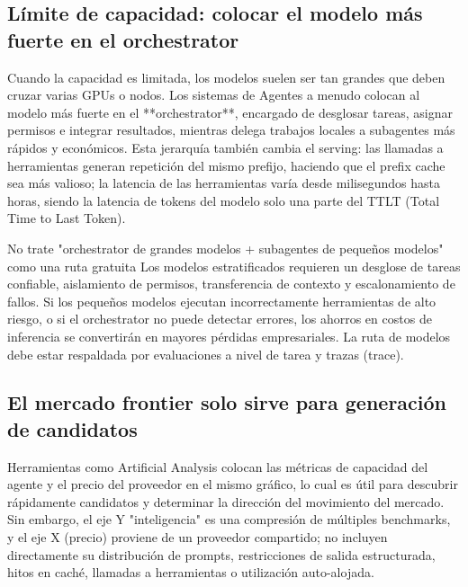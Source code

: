 
\subsection{Límite de capacidad: colocar el modelo más fuerte en el orchestrator}

Cuando la capacidad es limitada, los modelos suelen ser tan grandes que deben cruzar varias GPUs o nodos. Los sistemas de Agentes a menudo colocan al modelo más fuerte en el **orchestrator**, encargado de desglosar tareas, asignar permisos e integrar resultados, mientras delega trabajos locales a subagentes más rápidos y económicos. Esta jerarquía también cambia el serving: las llamadas a herramientas generan repetición del mismo prefijo, haciendo que el prefix cache sea más valioso; la latencia de las herramientas varía desde milisegundos hasta horas, siendo la latencia de tokens del modelo solo una parte del TTLT (Total Time to Last Token).


\begin{warningbox}{No trate "orchestrator de grandes modelos + subagentes de pequeños modelos" como una ruta gratuita}
Los modelos estratificados requieren un desglose de tareas confiable, aislamiento de permisos, transferencia de contexto y escalonamiento de fallos. Si los pequeños modelos ejecutan incorrectamente herramientas de alto riesgo, o si el orchestrator no puede detectar errores, los ahorros en costos de inferencia se convertirán en mayores pérdidas empresariales. La ruta de modelos debe estar respaldada por evaluaciones a nivel de tarea y trazas (trace).
\end{warningbox}

\subsection{El mercado frontier solo sirve para generación de candidatos}

Herramientas como Artificial Analysis colocan las métricas de capacidad del agente y el precio del proveedor en el mismo gráfico, lo cual es útil para descubrir rápidamente candidatos y determinar la dirección del movimiento del mercado. Sin embargo, el eje Y "inteligencia" es una compresión de múltiples benchmarks, y el eje X (precio) proviene de un proveedor compartido; no incluyen directamente su distribución de prompts, restricciones de salida estructurada, hitos en caché, llamadas a herramientas o utilización auto-alojada.


